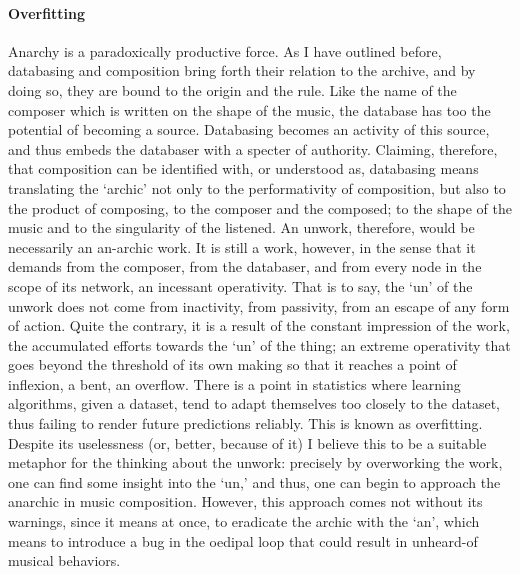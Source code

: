 \paragraph{Overfitting}
Anarchy is a paradoxically productive force. As I have outlined before, databasing and composition bring forth their relation to the archive, and by doing so, they are bound to the origin and the rule. Like the name of the composer which is written on the shape of the music, the database has too the potential of becoming a source. Databasing becomes an activity of this source, and thus embeds the databaser with a specter of authority. Claiming, therefore, that composition can be identified with, or understood as, databasing means translating the `archic' not only to the performativity of composition, but also to the product of composing, to the composer and the composed; to the shape of the music and to the singularity of the listened. An unwork, therefore, would be necessarily an an-archic work. It is still a work, however, in the sense that it demands from the composer, from the databaser, and from every node in the scope of its network, an incessant operativity. That is to say, the `un' of the unwork does not come from inactivity, from passivity, from an escape of any form of action. Quite the contrary, it is a result of the constant impression of the work, the accumulated efforts towards the `un' of the thing; an extreme operativity that goes beyond the threshold of its own making so that it reaches a point of inflexion, a bent, an overflow. There is a point in statistics where learning algorithms, given a dataset, tend to adapt themselves too closely to the dataset, thus failing to render future predictions reliably. This is known as overfitting. Despite its uselessness (or, better, because of it) I believe this to be a suitable metaphor for the thinking about the unwork: precisely by overworking the work, one can find some insight into the `un,' and thus, one can begin to approach the anarchic in music composition. However, this approach comes not without its warnings, since it means at once, to eradicate the archic with the `an', which means to introduce a bug in the oedipal loop that could result in unheard-of musical behaviors.

